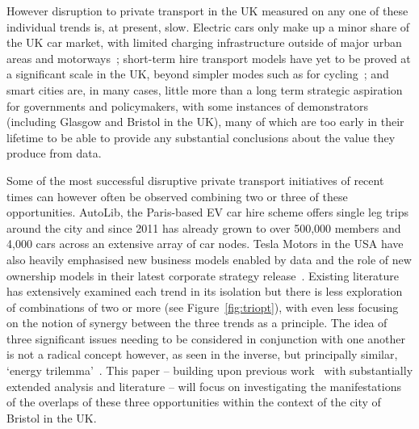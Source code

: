 \documentclass[journal]{IEEEtran}
\begin{document}
However disruption to private transport in the UK measured on any one
of these individual trends is, at present, slow. Electric cars only
make up a minor share of the UK car market, with limited charging
infrastructure outside of major urban areas and
motorways~\cite{dft:2008}; short-term hire transport models have yet
to be proved at a significant scale in the UK, beyond simpler modes
such as for cycling~\cite{kamargianni-et-al:2016}; and smart cities
are, in many cases, little more than a long term strategic aspiration
for governments and policymakers, with some instances of demonstrators
(including Glasgow and Bristol in the UK), many of which are too early
in their lifetime to be able to provide any substantial conclusions
about the value they produce from data.

Some of the most successful disruptive private transport initiatives
of recent times can however often be observed combining two or three
of these opportunities. AutoLib, the Paris-based EV car hire scheme
offers single leg trips around the city and since 2011 has already
grown to over 500,000 members and 4,000 cars across an extensive array
of car nodes. Tesla Motors in the USA have also heavily emphasised new
business models enabled by data and the role of new ownership models
in their latest corporate strategy release~\cite{musk:2016}. Existing
literature has extensively examined each trend in its isolation but
there is less exploration of combinations of two or more (see
Figure~\ref{fig:triopt}), with even less focusing on the notion of
synergy between the three trends as a principle. The idea of three
significant issues needing to be considered in conjunction with one
another is not a radical concept however, as seen in the inverse, but
principally similar, `energy trilemma'~\cite{wec:2015}. This paper --
building upon previous work~\cite{cooper-et-al-sose:2015} with
substantially extended analysis and literature -- will focus on
investigating the manifestations of the overlaps of these three
opportunities within the context of the city of Bristol in the UK.
\end{document}

